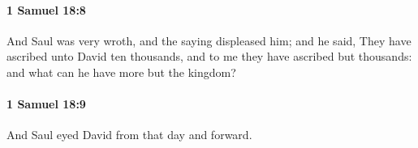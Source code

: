		\paragraph{1 Samuel 18:8} %
			\label{1SAMUEL-18-8}

			And Saul was very wroth, and the saying displeased him; and he said, They have ascribed unto David ten thousands, and to me they have ascribed but thousands: and what can he have more but the kingdom?


		\paragraph{1 Samuel 18:9} %
			\label{1SAMUEL-18-9}

			And Saul eyed David from that day and forward.



